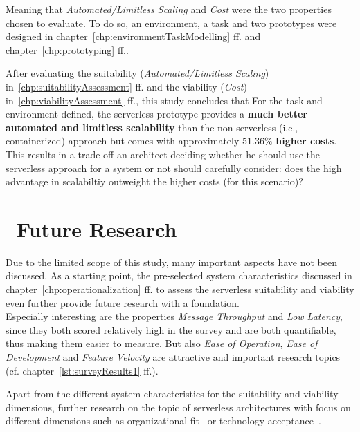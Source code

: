 Meaning that \textit{Automated/Limitless Scaling} and \textit{Cost} were the two properties chosen to evaluate. To do so, an environment, a task and two prototypes were designed in chapter~\vref{chp:environmentTaskModelling} ff. and chapter~\vref{chp:prototyping} ff.. 

After evaluating the suitability (\textit{Automated/Limitless Scaling}) in~\vref{chp:suitabilityAssessment} ff. and the viability (\textit{Cost}) in~\vref{chp:viabilityAssessment} ff., this study concludes that 
For the task and environment defined, the serverless prototype provides a \textbf{much better automated and limitless scalability} than the non-serverless (i.e., containerized) approach but comes with approximately $51.36\%$ \textbf{higher costs}.\\
This results in a trade-off an architect deciding whether he should use the serverless approach for a system or not should carefully consider: does the high advantage in scalabiltiy outweight the higher costs (for this scenario)? 


\section{\ Future Research}

Due to the limited scope of this study, many important aspects have not been discussed. As a starting point, the pre-selected system characteristics discussed in chapter~\vref{chp:operationalization} ff. to assess the serverless suitability and viability even further provide future research with a foundation. \\
Especially interesting are the properties \textit{Message Throughput} and \textit{Low Latency}, since they both scored relatively high in the survey and are both quantifiable, thus making them easier to measure. But also \textit{Ease of Operation}, \textit{Ease of Development} and \textit{Feature Velocity} are attractive and important research topics (cf. chapter~\vref{lst:surveyResults1} ff.). 

Apart from the different system characteristics for the suitability and viability dimensions, further research on the topic of serverless architectures with focus on different dimensions such as organizational fit~\autocite[see ][]{Depietro1990TheEnvironment}\highcomma\autocite[see ][]{Rogers1995DiffusionInnovations} or technology acceptance~\autocite[see ][]{Venkatesh2003UserViewb}\highcomma\autocite[see ][]{Davis1986AResults}\highcomma\autocite[see ][]{Davis1989UserModelsb}\highcomma\autocite[see ][]{Davis1989PerceivedTechnology}.

